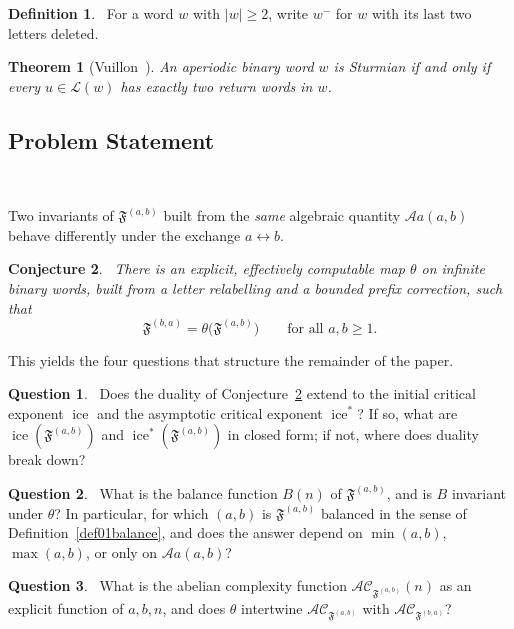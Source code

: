\documentclass[12pt]{amsart}
\theoremstyle{plain}
\newtheorem{theorem}{Theorem}[section]
\newtheorem{conjecture}[theorem]{Conjecture}
\theoremstyle{definition}
\newtheorem{definition}{Definition}
\newtheorem{question}{Question}
\theoremstyle{remark}
\newcommand{\ice}{\operatorname{ice}}
\newcommand{\aice}{\operatorname{ice}^*}
\newcommand{\AlphA}{\mathcal{A}}
\newcommand{\FD}{\mathfrak{F}}
\begin{document}
\begin{definition}~\label{def01central}
For a word $w$ with $|w|\ge2$, write $w^{-}$ for $w$ with its last two
letters deleted.
\end{definition}

\begin{theorem}[Vuillon~\cite{Vuillon2001}]
\label{thm01vuillon}
An aperiodic binary word $w$ is Sturmian if and only if every
$u\in\mathcal{L}(w)$ has exactly two return words in $w$.
\end{theorem}

\subsection{Problem Statement}~\label{subsec00problem}

Two invariants of $\FD^{(a,b)}$ built from
the \emph{same} algebraic quantity $\AlphA a(a,b)$ behave differently
under the exchange $a\leftrightarrow b$.


\begin{conjecture}~\label{conj01dualityinformal}
There is an explicit, effectively computable map $\theta$ on infinite
binary words, built from a letter relabelling and a bounded prefix
correction, such that
\[
  \FD^{(b,a)} = \theta\bigl(\FD^{(a,b)}\bigr)
  \qquad \text{for all } a,b\geqslant 1.
\]
\end{conjecture}

This yields the four questions that structure the remainder of the paper.

\begin{question}~\label{q01ce}
Does the duality of Conjecture~\ref{conj01dualityinformal} extend to
the initial critical exponent $\ice$ and the asymptotic critical
exponent $\aice$? If so, what are $\ice(\FD^{(a,b)})$ and
$\aice(\FD^{(a,b)})$ in closed form; if not, where does duality break down?
\end{question}

\begin{question}~\label{q02balance}
What is the balance function $B(n)$ of $\FD^{(a,b)}$, and is $B$ invariant
under $\theta$? In particular, for which $(a,b)$ is $\FD^{(a,b)}$ balanced
in the sense of Definition~\ref{def01balance}, and does the answer
depend on $\min(a,b)$, $\max(a,b)$, or only on $\AlphA a(a,b)$?
\end{question}

\begin{question}~\label{q03abelian}
What is the abelian complexity function $\mathcal{AC}_{\FD^{(a,b)}}(n)$ as
an explicit function of $a,b,n$, and does $\theta$ intertwine
$\mathcal{AC}_{\FD^{(a,b)}}$ with $\mathcal{AC}_{\FD^{(b,a)}}$?
\end{question}
\end{document}
